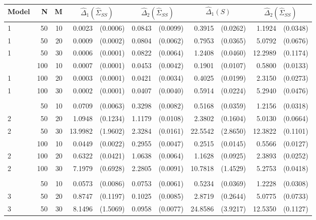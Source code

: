 \documentclass[12pt]{article}
\theoremstyle{definition}
\begin{document}
\begin{table}[H] \label{table:ssanova-estimator-performance-with-se-ure}
\centering
\begin{tabular}{lrrrrrrrrrr}
Model & N & M & \multicolumn{2}{c}{$\hat{\Delta}_1(\hat{\Sigma}_{SS})$} & \multicolumn{2}{c}{$\hat{\Delta}_2(\hat{\Sigma}_{SS})$} &  \multicolumn{2}{c}{$\hat{\Delta}_1(S)$} & \multicolumn{2}{c}{$\hat{\Delta}_2(\hat{\Sigma}_{SS})$} \\ 
  \hline
1 & 50 & 10 & 0.0023 & (0.0006) & 0.0843 & (0.0099) & 0.3915 & (0.0262) & 1.1924 & (0.0348) \\ 
  1 & 50 & 20 & 0.0009 & (0.0002) & 0.0804 & (0.0062) & 0.7953 & (0.0365) & 5.0792 & (0.0676) \\ 
  1 & 50 & 30 & 0.0006 & (0.0001) & 0.0822 & (0.0064) & 1.2408 & (0.0460) & 12.2989 & (0.1174) \\ 
  \hdashline
  1 & 100 & 10 & 0.0007 &(0.0001) & 0.0453 & (0.0042) & 0.1901 & (0.0107) & 0.5800 & (0.0133) \\ 
  1 & 100 & 20 & 0.0003 & (0.0001) & 0.0421 &(0.0034) & 0.4025 & (0.0199) & 2.3150 & (0.0273) \\ 
  1 & 100 & 30 & 0.0002 & (0.0001) & 0.0407 & (0.0040) & 0.5914 & (0.0224) & 5.2940 & (0.0476) \\ 
    \hdashline \\
      \hdashline
  2 & 50 & 10 & 0.0709 & (0.0063) & 0.3298 & (0.0082) & 0.5168 & (0.0359) & 1.2156 & (0.0318) \\ 
  2 & 50 & 20 & 1.0948 & (0.1234) & 1.1179 & (0.0108) & 2.3802 & (0.1604) & 5.0130 & (0.0664) \\ 
  2 & 50 & 30 & 13.9982 & (1.9602) & 2.3284 & (0.0161) & 22.5542 & (2.8650) & 12.3822 & (0.1101) \\ 
    \hdashline
  2 & 100 & 10 & 0.0449 & (0.0022) & 0.2955 & (0.0047) & 0.2515 & (0.0145) & 0.5566 & (0.0127) \\ 
  2 & 100 & 20 & 0.6322 & (0.0421) & 1.0638 & (0.0064) & 1.1628 & (0.0925) & 2.3893 & (0.0252) \\ 
  2 & 100 & 30 & 7.1979 & (0.6928) & 2.2805 & (0.0091) & 10.7818 & (1.4529) & 5.2753 & (0.0418) \\ 
    \hdashline \\
      \hdashline
  3 & 50 & 10 & 0.0573 & (0.0086) & 0.0753 & (0.0061) & 0.5234 & (0.0369) & 1.2228 & (0.0308) \\ 
  3 & 50 & 20 & 0.8747 & (0.1197) & 0.1025 & (0.0085) & 2.8719 & (0.2644) & 5.0775 & (0.0733) \\ 
  3 & 50 & 30 & 8.1496 & (1.5069) & 0.0958 & (0.0077) & 24.8586 & (3.9217) & 12.5350 & (0.1127) \\ 

\end{tabular}
\end{table}
\end{document}
